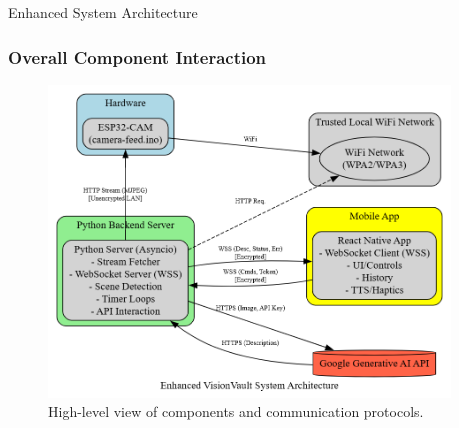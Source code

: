 \documentclass{beamer}
\begin{document}
\begin{frame}{Enhanced System Architecture}
    \frametitle{Overall Component Interaction}
    \begin{figure}
        \centering
        \includegraphics[width=0.95\textwidth]{Sys_Arch.png} %
        \caption{High-level view of components and communication protocols.}
    \end{figure}
\end{frame}
\end{document}
